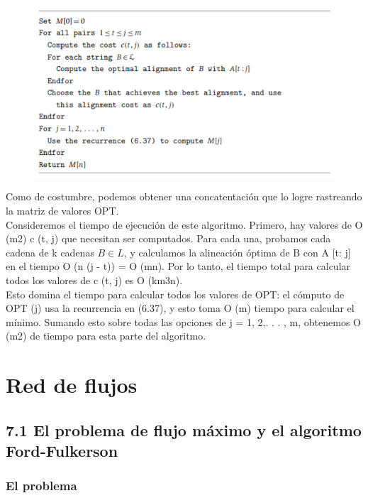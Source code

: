 \documentclass[a4paper]{article}
\begin{document}
\begin{figure}[h]
\centering
\includegraphics[scale=1]{Imagenes-Seccion6/cod6_19.PNG}
\end{figure}

Como de costumbre, podemos obtener una concatentación que lo logre rastreando la matriz de valores OPT.\\

Consideremos el tiempo de ejecución de este algoritmo. Primero, hay valores de O (m2) c (t, j) que necesitan ser computados. Para cada una, probamos cada cadena de k cadenas $B  \in  L$, y calculamos la alineación óptima de B con A [t: j] en el tiempo O (n (j - t)) = O (mn). Por lo tanto, el tiempo total para calcular todos los valores de c (t, j) es O (km3n).\\

Esto domina el tiempo para calcular todos los valores de OPT: el cómputo de OPT (j) usa la recurrencia en (6.37), y esto toma O (m) tiempo para calcular el mínimo. Sumando esto sobre todas las opciones de j = 1, 2,. . . , m, obtenemos O (m2) de tiempo para esta parte del algoritmo.\\


\newpage

\section{Red de flujos}

\subsection{7.1 El problema de flujo máximo y el algoritmo Ford-Fulkerson}

\subsubsection*{El problema}
\end{document}
